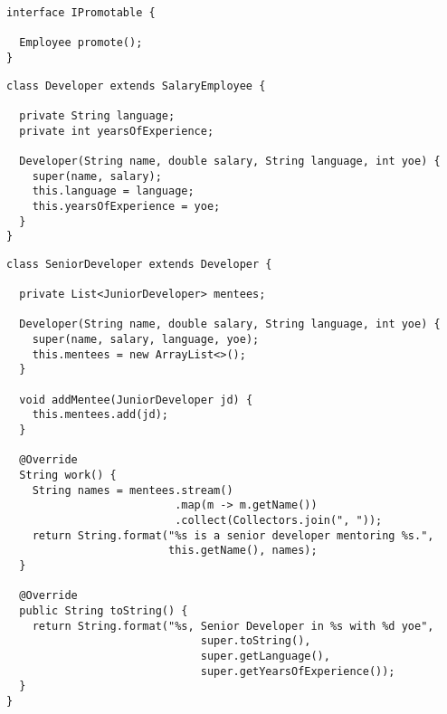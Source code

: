 \begin{lstlisting}[language=MyJava]
interface IPromotable {

  Employee promote();
}
\end{lstlisting}

\begin{lstlisting}[language=MyJava]
class Developer extends SalaryEmployee {

  private String language;
  private int yearsOfExperience;

  Developer(String name, double salary, String language, int yoe) {
    super(name, salary);
    this.language = language;
    this.yearsOfExperience = yoe;
  }
}
\end{lstlisting}

\begin{lstlisting}[language=MyJava]
class SeniorDeveloper extends Developer {

  private List<JuniorDeveloper> mentees;

  Developer(String name, double salary, String language, int yoe) {
    super(name, salary, language, yoe);
    this.mentees = new ArrayList<>();
  }

  void addMentee(JuniorDeveloper jd) {
    this.mentees.add(jd);
  }

  @Override
  String work() {
    String names = mentees.stream()
                          .map(m -> m.getName())
                          .collect(Collectors.join(", "));
    return String.format("%s is a senior developer mentoring %s.", 
                         this.getName(), names);
  }

  @Override
  public String toString() {
    return String.format("%s, Senior Developer in %s with %d yoe", 
                              super.toString(), 
                              super.getLanguage(),
                              super.getYearsOfExperience());
  }
}
\end{lstlisting}

